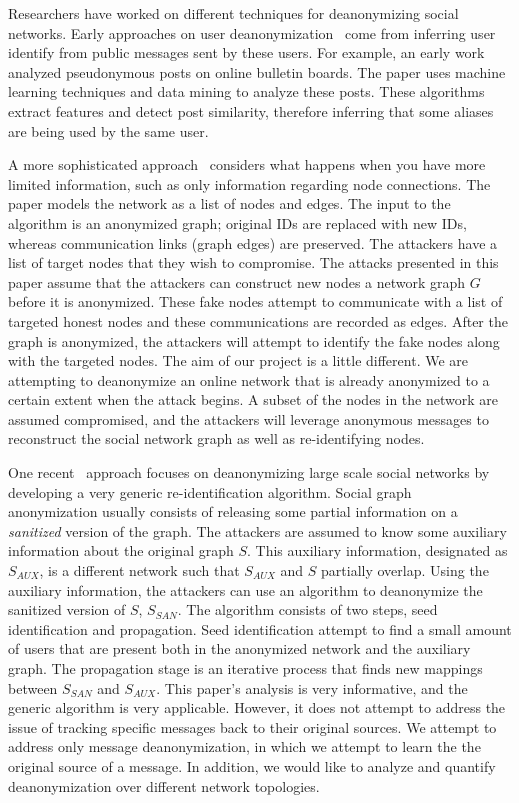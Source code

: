 Researchers have worked on different techniques for deanonymizing social networks. Early approaches on user deanonymization~\cite{novak2004anti,narayanan2006break} come from inferring user identify from public messages sent by these users. For example, an early work~\cite{novak2004anti} analyzed pseudonymous posts on online bulletin boards. The paper uses machine learning techniques and data mining to analyze these posts. These algorithms extract features and detect post similarity, therefore inferring that some aliases are being used by the same user. 

A more sophisticated approach~\cite{backstrom2007wherefore} considers what happens when you have more limited information, such as only information regarding node connections. The paper models the network as a list of nodes and edges. The input to the algorithm is an anonymized graph; original IDs are replaced with new IDs, whereas communication links (graph edges) are preserved. The attackers have a list of target nodes that they wish to compromise.
The attacks presented in this paper assume that the attackers can construct new nodes a network graph $G$ before it is anonymized. These fake nodes attempt to communicate with a list of targeted honest nodes and these communications are recorded as edges. After the graph is anonymized, the attackers will attempt to identify the fake nodes along with the targeted nodes. 
The aim of our project is a little different. We are attempting to deanonymize an online network that is already anonymized to a certain extent when the attack begins. A subset of the nodes in the network are assumed compromised, and the attackers will leverage anonymous messages to reconstruct the social network graph as well as re-identifying nodes. 

One recent~\cite{narayanan2009anonymizing} approach focuses on deanonymizing large scale social networks by developing a very generic re-identification algorithm. Social graph \\ anonymization usually consists of releasing some partial information on a \emph{sanitized} version of the graph. 
The attackers are assumed to know some auxiliary information about the original graph $S$. This auxiliary information, designated as $S_{AUX}$, is a different network such that $S_{AUX}$ and $S$ partially overlap. Using the auxiliary information, the attackers can use an algorithm to deanonymize the sanitized version of $S$, $S_{SAN}$.
The algorithm consists of two steps, seed identification and propagation. Seed identification attempt to find a small amount of users that are present both in the anonymized network and the auxiliary graph. The propagation stage is an iterative process that finds new mappings between $S_{SAN}$ and $S_{AUX}$. This paper's analysis is very informative, and the generic algorithm is very applicable. However, it does not attempt to address the issue of tracking specific messages back to their original sources. We attempt to address only message deanonymization, in which we attempt to learn the the original source of a message. In addition, we would like to analyze and quantify deanonymization over different network topologies.

